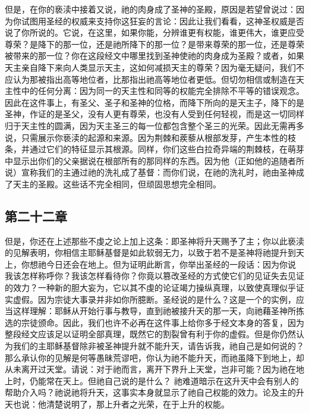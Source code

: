 但是，在你的亵渎中接着又说，祂的肉身成了圣神的圣殿，原因是若望曾说过：因为你试图用圣经的权威来支持你这狂妄的言论：因此让我们看看，这神圣权威是否说了你所说的。它说，在这里，如果你能，分辨谁更有权能，谁更伟大，谁更应受尊荣？是降下的那一位，还是祂所降下的那一位？是带来尊荣的那一位，还是尊荣被带来的那一位？你在这段经文中哪里找到圣神使祂的肉身成为圣殿？或者，如果天主亲自降下来向人类显示天主，这如何减损天主的尊荣？因为毫无疑问，我们不应认为那被指出高等地位者，比那指出祂高等地位者更低。但切勿相信或制造在天主性中的任何分离：因为同一的天主性和同等的权能完全排除不平等的错误观念。因此在这件事上，有圣父、圣子和圣神的位格，而降下所向的是天主子，降下的是圣神，作证的是圣父，没有人更有尊荣，也没有人受到任何轻视，而是这一切同样归于天主性的圆满，因为天主圣三的每一位都包含整个圣三的光荣。因此无需再多说，只需展示你亵渎的起源和来源。因为荆棘和蒺藜从根部发芽，产生本性的枝条，并通过它们的特征显示其根源。同样，你们这些白拉奇异端的荆棘枝，在萌芽中显示出你们的父亲据说在根部所有的那同样的东西。因为他（正如他的追随者所说）宣称我们的主通过祂的洗礼成了基督：而你们说，在祂的洗礼时，祂由圣神成了天主的圣殿。这些话不完全相同，但顽固思想完全相同。\par


\subsection{第二十二章}

\par

但是，你还在上述那些不虔之论上加上这条：即圣神将升天赐予了主；你以此亵渎的见解表明，你相信主耶稣基督是如此软弱无力，以致于若不是圣神将祂提升到天上，你想祂今日还会在地上。但为证明此断言，你举出圣经的一段话：因为你说 我该怎样称呼你？我该怎样看待你？你竟以篡改圣经的方式使它们的见证失去见证的效力？一种新的胆大妄为，它以其不虔的论证竭力操纵真理，以致使真理似乎证实虚假。因为宗徒大事录并非如你所臆断。圣经说的是什么？这是一个的实例，应当这样理解：耶稣从开始行事与教导，直到祂被接升天的那一天，向祂藉圣神所拣选的宗徒颁命。因此，我们也许不必再在这件事上给你多于经文本身的答复，因为整段经文应该足以证明全部真理，既然它的割裂曾有利于你的虚假。但是你仍然认为我们的主耶稣基督除非被圣神提升就不能升天，请告诉我，祂自己是如何说的？ 那么承认你的见解是何等愚昧荒谬吧，你认为祂不能升天，而祂虽降下到地上，却从未离开过天堂。请说：对于祂而言，离开下界升上天堂，岂非可能？因为祂在地上时，仍能常在天上。但祂自己说的是什么？ 祂难道暗示在这升天中会有别人的帮助介入吗？祂说祂将升天，这事实本身就显示了祂自己权能的效力。论及主的升天也说：他清楚说明了，那上升者之光荣，在于上升的权能。\par

